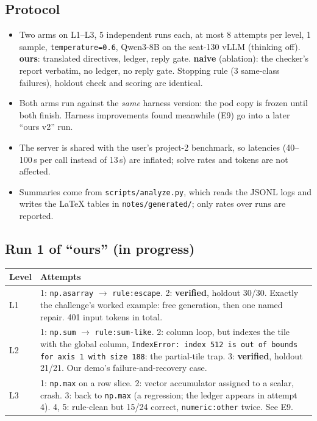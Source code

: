 \documentclass[11pt]{article}
\newcommand{\code}[1]{\texttt{#1}}
\begin{document}
\subsection{Protocol}
\begin{itemize}
  \item Two arms on L1--L3, 5 independent runs each, at most 8 attempts per level, 1 sample,
        \code{temperature=0.6}, Qwen3-8B on the seat-130 vLLM (thinking off).
        \textbf{ours}: translated directives, ledger, reply gate.
        \textbf{naive} (ablation): the checker's report verbatim, no ledger, no reply gate.
        Stopping rule (3 same-class failures), holdout check and scoring are identical.
  \item Both arms run against the \emph{same} harness version: the pod copy is frozen until both
        finish. Harness improvements found meanwhile (E9) go into a later ``ours v2'' run.
  \item The server is shared with the user's project-2 benchmark, so latencies (40--100\,s per
        call instead of 13\,s) are inflated; solve rates and tokens are not affected.
  \item Summaries come from \code{scripts/analyze.py}, which reads the JSONL logs and writes the
        LaTeX tables in \code{notes/generated/}; only rates over runs are reported.
\end{itemize}

\subsection{Run 1 of ``ours'' (in progress)}
\begin{tabularx}{\linewidth}{@{}lY@{}}
\toprule
Level & Attempts \\
\midrule
L1 & 1: \code{np.asarray} $\to$ \code{rule:escape}. 2: \textbf{verified}, holdout 30/30. Exactly the
  challenge's worked example: free generation, then one named repair. 401 input tokens in total. \\
L2 & 1: \code{np.sum} $\to$ \code{rule:sum-like}. 2: column loop, but indexes the tile with the
  global column, \code{IndexError: index 512 is out of bounds for axis 1 with size 188}: the
  partial-tile trap. 3: \textbf{verified}, holdout 21/21. Our demo's failure-and-recovery case. \\
L3 & 1: \code{np.max} on a row slice. 2: vector accumulator assigned to a scalar, crash. 3: back to
  \code{np.max} (a regression; the ledger appears in attempt 4). 4, 5: rule-clean but 15/24
  correct, \code{numeric:other} twice. See E9. \\
\bottomrule
\end{tabularx}
\end{document}
